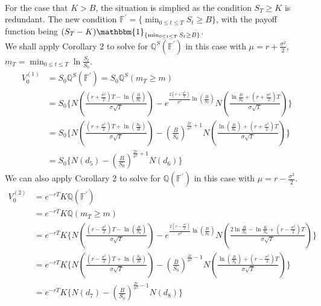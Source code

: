 \\For the case that $K > B$, the situation is simplied as the condition $S_{T} \ge K$ is redundant. The new condition $\mathbb{F}^{\prime} = \displaystyle \{ \min_{0 \le t \le T} S_{t} \ge B \}$, with the payoff function being $(S_{T} - K)\mathbbm{1}_{\{ \min_{0 \le t \le T} S_{t} \ge B \}}$.\\
We shall apply Corollary 2 to solve for $\mathbb{Q}^{S}(\mathbb{F}^{\prime})$ in this case with $\mu = r + \frac{\sigma^{2}}{2}$, $\displaystyle m_{T} = \min_{0 \le t \le T} \ln{\frac{S_{t}}{S_{0}}}$.\\
\begin{equation*}
\begin{split}
V_{0}^{(1)}
&= S_{0}\mathbb{Q}^{S}({\mathbb{F}}^{\prime}) = S_{0}\mathbb{Q}^{S}(m_{T} \ge m)\\
&= S_{0}\{ N(\frac{(r+\frac{\sigma^{2}}{2})T - \ln{(\frac{B}{S_{0}})}}{\sigma \sqrt{T}}) - e^{\frac{2(r+\frac{\sigma^{2}}{2})}{\sigma^{2}}\ln{(\frac{B}{S_{0}})}} N(\frac{\ln{\frac{B}{S_{0}} + (r + \frac{\sigma^{2}}{2})T}}{\sigma \sqrt{T}}) \}\\
&= S_{0}\{ N(\frac{(r+\frac{\sigma^{2}}{2})T + \ln{(\frac{S_{0}}{B})}}{\sigma \sqrt{T}}) - {(\frac{B}{S_{0}})}^{\frac{2r}{\sigma^{2}}+1} N(\frac{\ln{(\frac{B}{S_{0}})} + (r + \frac{\sigma^{2}}{2})T}{\sigma \sqrt{T}}) \}\\
&= S_{0}\{ N(d_{5}) - {(\frac{B}{S_{0}})}^{\frac{2r}{\sigma^{2}}+1} N(d_{6}) \}
\end{split}
\end{equation*}
We can also apply Corollary 2 to solve for $\mathbb{Q}(\mathbb{F}^{\prime})$ in this case with $\mu = r - \frac{\sigma^{2}}{2}$.
\begin{equation*}
\begin{split}
V_{0}^{(2)}
&= e^{-rT}K\mathbb{Q}({\mathbb{F}^{\prime}})\\
&= e^{-rT}K\mathbb{Q}(m_{T} \ge m)\\
&= e^{-rT}K\{ N(\frac{(r-\frac{\sigma^{2}}{2})T - \ln{(\frac{B}{S_{0}})}}{\sigma \sqrt{T}}) - e^{\frac{2(r-\frac{\sigma^{2}}{2})}{\sigma^{2}}\ln{{(\frac{B}{S_{0}})}}} N(\frac{2\ln{\frac{B}{S_{0}} - \ln{\frac{K}{S_{0}}} + (r - \frac{\sigma^{2}}{2})T}}{\sigma \sqrt{T}}) \}\\
&= e^{-rT}K\{ N(\frac{(r-\frac{\sigma^{2}}{2})T + \ln{(\frac{S_{0}}{B})}}{\sigma \sqrt{T}}) - {(\frac{B}{S_{0}})}^{\frac{2r}{\sigma^{2}}-1} N(\frac{\ln{(\frac{B}{S_{0}})} + (r - \frac{\sigma^{2}}{2})T}{\sigma \sqrt{T}}) \}\\
&= e^{-rT}K\{ N(d_{7}) - {(\frac{B}{S_{0}})}^{\frac{2r}{\sigma^{2}}-1} N(d_{8}) \}
\end{split}
\end{equation*}
